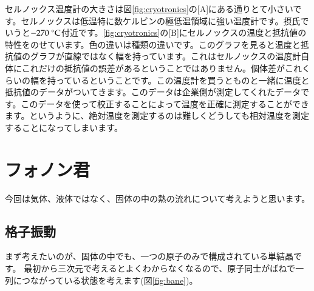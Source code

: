 \documentclass[10pt,b5paper,papersize,dvipdfmx]{jsbook}
\begin{document}
セルノックス温度計の大きさは図\ref{fig:cryotronics}の[A]にある通りとて小さいです。セルノックスは低温特に数ケルビンの極低温領域に強い温度計です。摂氏でいうと$-270\ ^\circ \rm{C}$付近です。\ref{fig:cryotronics}の[B]にセルノックスの温度と抵抗値の特性をのせています。色の違いは種類の違いです。このグラフを見ると温度と抵抗値のグラフが直線ではなく幅を持っています。これはセルノックスの温度計自体にこれだけの抵抗値の誤差があるということではありません。個体差がこれくらいの幅を持っているということです。この温度計を買うとものと一緒に温度と抵抗値のデータがついてきます。このデータは企業側が測定してくれたデータです。このデータを使って校正することによって温度を正確に測定することができます。というように、絶対温度を測定するのは難しくどうしても相対温度を測定することになってしまいます。

\section{フォノン君}
今回は気体、液体ではなく、固体の中の熱の流れについて考えようと思います。
\subsection{格子振動}
まず考えたいのが、固体の中でも、一つの原子のみで構成されている単結晶です。
最初から三次元で考えるとよくわからなくなるので、原子同士がばねで一列につながっている状態を考えます(図\ref{fig:bane})。\par
\end{document}
